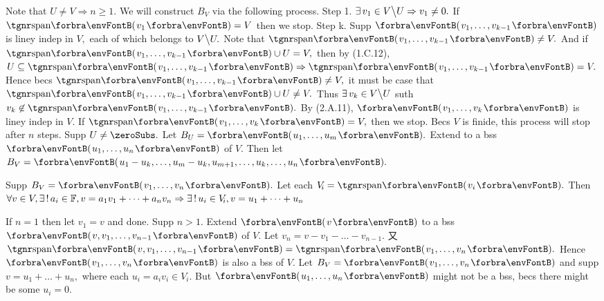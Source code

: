 \TextB{\vspace{0pt}}
Note that $U\neq V\Rightarrow n\geqslant 1.$ We will construct $B_V$ via the following process.\TextB{}
{\tgbfx Step 1.} $\exists\,v_1\in V\big\backslash U\Rightarrow v_1\neq 0.$ If $\Span{v_1}=V$ then we stop.\TextB{}
{\tgbfx Step k.} Supp $\Par{v_1,\dots,v_{k-1}}$ is liney indep in $V,$ each of which belongs to $V\big\backslash U.$\TextB{}
 Note that $\Span{v_1,\dots,v_{k-1}}\neq V.$ And if $\Span{v_1,\dots,v_{k-1}}\cup U=V,$ then by (1.C.12),\TextB{}
  $U\subseteq \Span{v_1,\dots,v_{k-1}}\Rightarrow\Span{v_1,\dots,v_{k-1}}=V.$\TextB{}
 Hence becs $\Span{v_1,\dots,v_{k-1}}\neq V,$ it must be case that $\Span{v_1,\dots,v_{k-1}}\cup U\neq V.$\TextB{}
 Thus $\exists\,v_k\in V\big\backslash U$ suth $v_k\not\in\Span{v_1,\dots,v_{k-1}}.$\TextB{}
 By (2.A.11), $\Par{v_1,\dots,v_k}$ is liney indep in $V$. If $\Span{v_1,\dots,v_k}=V,$ then we stop.\TextB{}
Becs $V$ is finide, this process will stop after $n$ steps.\PfEnd\vspace{4pt}\TextB{}
\Or Supp $U\neq\zeroSubs.$ Let $B_U=\Par{u_1,\dots,u_m}.$ Extend to a bss $\Par{u_1,\dots,u_n}$ of $V.$\TextB{}
\Blind{\Or}Then let $B_V=\Par{u_1-u_k,\dots,u_m-u_k,u_{m+1},\dots,u_k,\dots,u_n}.$\PfEnd
\SepLine\ChEnd
\pagebreak


\vspace{4pt}


Supp $B_V=\Par{v_1,\dots,v_n}.$ Let each $V_{\!i}=\Span{v_i}.$\parSol{}
Then $\forall v\in V,\exists\,!\,a_i\in{\mathbb{F}},v=a_1 v_1+\dots+a_n v_n\Rightarrow\exists\,!\,u_i\in V_{\!i},v=u_1+\dots+u_n$\PfEnd
\SepLine

If $n=1$ then let $v_1=v$ and done. Supp $n>1.$\parSol{}
Extend $\Par{v}$ to a bss $\Par{v,v_1,\dots,v_{n-1}}$ of $V.$ Let $v_n=v-v_1-\dots-v_{n-1}.$\parSol{}
又 $\Span{v,v_1,\dots,v_{n-1}}=\Span{v_1,\dots,v_n}.$ Hence $\Par{v_1,\dots,v_n}$ is also a bss of $V.$\PfEnd\vspace{4pt}
\AComm Let $B_V=\Par{v_1,\dots,v_n}$ and supp $v=u_1+\dots+u_n,$ where each $u_i=a_i v_i\in V_{\!i}.$\parCom
But $\Par{u_1,\dots,u_n}$ might not be a bss, becs there might be some $u_i=0.$\vspace{-2pt}
\SepLine


